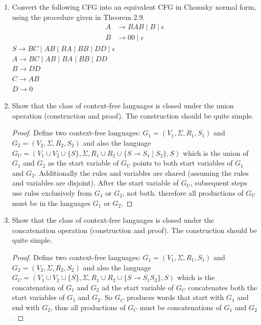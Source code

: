 \documentclass{article}
\begin{document}
\begin{enumerate}
        \item Convert the following CFG into an equivalent CFG in Chomsky normal form, using the procedure given in Theorem 2.9.
            \begin{align*}
                A&\rightarrow BAB\mid B\mid \epsilon\\
                B&\rightarrow 00 \mid \epsilon
            \end{align*}
            $S\rightarrow BC \mid AB \mid BA \mid BB \mid DD \mid \epsilon$\\
            $A\rightarrow BC\mid AB \mid BA \mid BB \mid DD$\\
            $B\rightarrow DD$\\
            $C\rightarrow AB$\\
            $D\rightarrow 0$
        \item Show that the class of context-free languages is closed under the union operation (construction and proof). The construction should be quite simple.
            \begin{proof}
                Define two context-free languages: $G_1=(V_1, \Sigma, R_1, S_1)$ and $G_2=(V_2, \Sigma, R_2, S_2)$ and also the language $G_U = (V_1\cup V_2\cup \{S\},\Sigma, R_1\cup R_2\cup \{S\rightarrow S_1 \mid S_2\}, S )$ which is the union of $G_1$ and $G_2$ as the start variable of $G_U$ points to both start variables of $G_1$ and $G_2$. Additionally the rules and variables are shared (assuming the rules and variables are disjoint). After the start variable of $G_U$, subsequent steps use rules exclusively from $G_1$ or $G_2$, not both. therefore all productions of $G_U$ must be in the languages $G_1$ or $G_2$.
            \end{proof}
        \item Show that the class of context-free languages is closed under the concatenation operation (construction and proof). The construction should be quite simple.
            \begin{proof}
                Define two context-free languages: $G_1=(V_1, \Sigma, R_1, S_1)$ and $G_2=(V_2, \Sigma, R_2, S_2)$ and also the language $G_C=(V_1\cup V_2\cup \{S\}, \Sigma, R_1\cup R_2\cup \{S\rightarrow S_1S_2\}, S)$ which is the concatenation of $G_1$ and $G_2$ ad the start variable of $G_C$ concatenates both the start variables of $G_1$ and $G_2$. So $G_C$ produces words that start with $G_1$ and end with $G_2$, thus all productions of $G_C$ must be concatenations of $G_1$ and $G_2$.
            \end{proof}

\end{enumerate}
\end{document}
